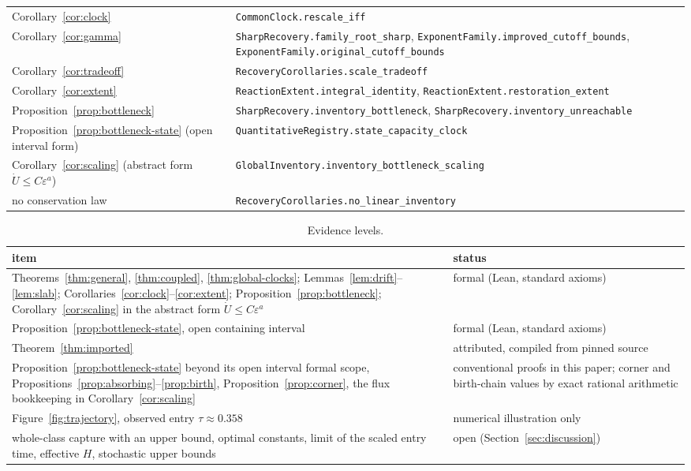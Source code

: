 \documentclass[11pt,a4paper]{article}
\theoremstyle{plain}
\theoremstyle{definition}
\theoremstyle{remark}
\newcommand{\eps}{\varepsilon}
\newcommand{\lean}[1]{\texttt{#1}}
\begin{document}
\begin{table}[htb]
\begin{tabular}{>{\raggedright\arraybackslash}p{.33\linewidth}>{\raggedright\arraybackslash}p{.60\linewidth}}
Corollary~\ref{cor:clock} & \lean{CommonClock.rescale\_iff}\\
Corollary~\ref{cor:gamma} & \lean{SharpRecovery.family\_root\_sharp}, \lean{ExponentFamily.improved\_cutoff\_bounds}, \lean{ExponentFamily.original\_cutoff\_bounds}\\
Corollary~\ref{cor:tradeoff} & \lean{RecoveryCorollaries.scale\_tradeoff}\\
Corollary~\ref{cor:extent} & \lean{ReactionExtent.integral\_identity}, \lean{ReactionExtent.restoration\_extent}\\
Proposition~\ref{prop:bottleneck} & \lean{SharpRecovery.inventory\_bottleneck}, \lean{SharpRecovery.inventory\_unreachable}\\
Proposition~\ref{prop:bottleneck-state} (open interval form) & \lean{QuantitativeRegistry.state\_capacity\_clock}\\
Corollary~\ref{cor:scaling} (abstract form $\dot U\le C\eps^a$) & \lean{GlobalInventory.inventory\_bottleneck\_scaling}\\
no conservation law & \lean{RecoveryCorollaries.no\_linear\_inventory}\\
\bottomrule
\end{tabular}
\end{table}

\begin{table}[htb]
\centering\small
\caption{Evidence levels.}
\label{tab:evidence}
\begin{tabular}{>{\raggedright\arraybackslash}p{.52\linewidth}>{\raggedright\arraybackslash}p{.42\linewidth}}
\toprule
item & status\\
\midrule
Theorems~\ref{thm:general}, \ref{thm:coupled}, \ref{thm:global-clocks}; Lemmas~\ref{lem:drift}--\ref{lem:slab}; Corollaries~\ref{cor:clock}--\ref{cor:extent}; Proposition~\ref{prop:bottleneck}; Corollary~\ref{cor:scaling} in the abstract form $\dot U\le C\eps^a$ & formal (Lean, standard axioms)\\
Proposition~\ref{prop:bottleneck-state}, open containing interval & formal (Lean, standard axioms)\\
Theorem~\ref{thm:imported} & attributed, compiled from pinned source\\
Proposition~\ref{prop:bottleneck-state} beyond its open interval formal scope, Propositions~\ref{prop:absorbing}--\ref{prop:birth}, Proposition~\ref{prop:corner}, the flux bookkeeping in Corollary~\ref{cor:scaling} & conventional proofs in this paper; corner and birth-chain values by exact rational arithmetic\\
Figure~\ref{fig:trajectory}, observed entry $\tau\approx0.358$ & numerical illustration only\\
whole-class capture with an upper bound, optimal constants, limit of the scaled entry time, effective $H$, stochastic upper bounds & open (Section~\ref{sec:discussion})\\
\bottomrule
\end{tabular}
\end{table}
\end{document}
